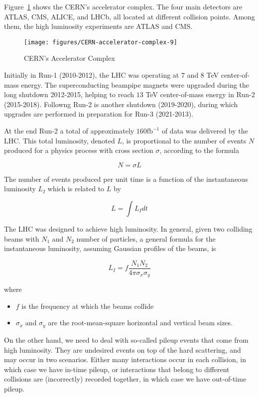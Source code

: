 Figure~\ref{f:lhcmap} shows the CERN's accelerator complex. The four main
detectors are ATLAS, CMS, ALICE, and LHCb, all located at different collision
points. Among them, the high luminosity experiments are ATLAS and CMS.

\begin{figure}[H]
	\texttt{[image: figures/CERN-accelerator-complex-9]}
	\centering
	\caption{CERN's Accelerator Complex} \cite{acccomplex}
	\label{f:lhcmap}
\end{figure}


Initially in Run-1 (2010-2012), the LHC was operating at $7$ and $8$ TeV
center-of-mass energy. The superconducting beampipe magnets were upgraded
during the long shutdown 2012-2015, helping to reach $13$ TeV center-of-mass
energy in Run-2 (2015-2018). Followng Run-2 is another shutdown (2019-2020),
during which upgrades are performed in preparation for Run-3 (2021-2013).

At the end Run-2 a total of approximately $160\text{fb}^{-1}$ of data was
delivered by the LHC. This total luminosity, denoted $L$, is proportional to
the number of events $N$ produced for a physics process with cross section
$\sigma$, according to the formula

$$ N = \sigma L$$

The number of events produced per unit time is a function of the instantaneous
luminosity $L_I$ which is related to $L$ by

$$ L = \int L_I dt $$

The LHC was designed to achieve high luminosity. In general,
given two colliding beams
with $N_1$ and $N_2$ number of particles, a general formula for the
instantaneous luminosity, assuming Gaussian profiles of the beams, is

$$L_I = f \frac{N_1N_2}{4\pi \sigma_x\sigma_y} $$

where

\begin{itemize}
	\item $f$ is the frequency at which the beams collide

	\item $\sigma_x$ and $\sigma_y$ are the root-mean-square horizontal and
	      vertical beam sizes.

\end{itemize}

On the other hand, we need to deal with so-called pileup events that come from
high luminosity. They are undesired events on top of the hard scattering, and
may occur in two scenarios. Either many interactions occur in each collision,
in which case we have in-time pileup, or interactions that belong to different
collisions are (incorrectly) recorded together, in which case we have
out-of-time pileup.

